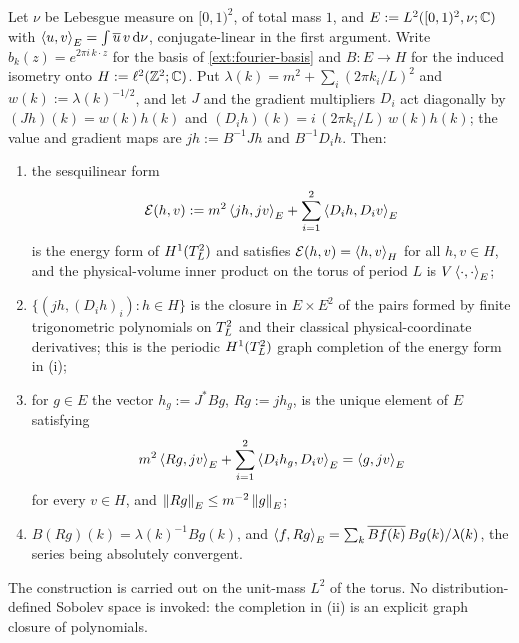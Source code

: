 \begin{lemma}\label{lem:resolvent}
Let $\nu$ be Lebesgue measure on $[0,1)^2$, of total mass $1$, and
$E:=L^2([0,1)^2,\nu;\mathbb{C})$ with $\left\langle u, v \right\rangle_E=\int\overline{u}\,v\,\mathrm{d}\nu$,
conjugate-linear in the first argument. Write $b_k(z)=e^{2\pi i\,k\cdot z}$ for
the basis of \cref{ext:fourier-basis} and $B:E\to H$ for the induced isometry
onto $H:=\ell^2(\mathbb{Z}^2;\mathbb{C})$. Put $\lambda(k)=m^2+\sum_i(2\pi k_i/L)^2$ and
$w(k):=\lambda(k)^{-1/2}$, and let $J$ and the gradient multipliers $D_i$ act
diagonally by $(Jh)(k)=w(k)h(k)$ and
$(D_ih)(k)=i\,(2\pi k_i/L)\,w(k)h(k)$; the value and gradient maps are
$jh:=B^{-1}Jh$ and $B^{-1}D_ih$. Then:
\begin{enumerate}
\item[(i)] the sesquilinear form
  \begin{equation}\label{eq:energy-form}
    \mathcal E(h,v):=m^2\left\langle jh, jv \right\rangle_E+\sum_{i=1}^2\left\langle D_ih, D_iv \right\rangle_E
  \end{equation}
  is the energy form of $H^1(T_L^2)$ and satisfies
  $\mathcal E(h,v)=\left\langle h, v \right\rangle_H$ for all $h,v\in H$, and the physical-volume
  inner product on the torus of period $L$ is $V\left\langle \cdot, \cdot \right\rangle_E$;
\item[(ii)] $\{(jh,(D_ih)_i):h\in H\}$ is the closure in $E\times E^2$ of the
  pairs formed by finite trigonometric polynomials on $T_L^2$ and their
  classical physical-coordinate derivatives; this is the periodic
  $H^1(T_L^2)$ graph completion of the energy form in (i);
\item[(iii)] for $g\in E$ the vector $h_g:=J^*Bg$, $Rg:=jh_g$, is the unique
  element of $E$ satisfying
  \begin{equation}\label{eq:weak-equation}
    m^2\left\langle Rg, jv \right\rangle_E+\sum_{i=1}^2\left\langle D_ih_g, D_iv \right\rangle_E=\left\langle g, jv \right\rangle_E
  \end{equation}
  for every $v\in H$, and $\left\| Rg \right\|_E\le m^{-2}\left\| g \right\|_E$;
\item[(iv)] $B(Rg)(k)=\lambda(k)^{-1}Bg(k)$, and
  $\left\langle f, Rg \right\rangle_E=\sum_k\overline{Bf(k)}\,Bg(k)/\lambda(k)$, the series being
  absolutely convergent.
\end{enumerate}
The construction is carried out on the unit-mass $L^2$ of the torus. No
distribution-defined Sobolev space is invoked: the completion in (ii) is an
explicit graph closure of polynomials.
\end{lemma}

